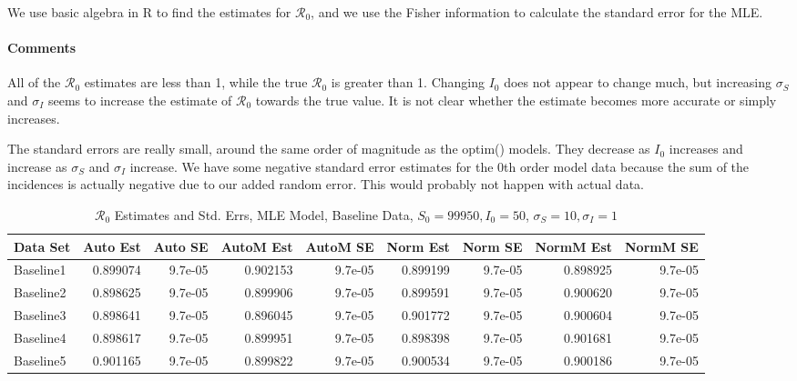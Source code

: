 \documentclass[12pt]{article}
\newcommand{\rr}{\ensuremath{\mathcal{R}_0}}
\begin{document}
We use basic algebra in R to find the estimates for $\rr$, and we use the Fisher information to calculate the standard error for the MLE.

\paragraph{Comments}

All of the $\rr$ estimates are less than 1, while the true $\rr$ is greater than 1. Changing $I_0$ does not appear to change much, but increasing $\sigma_S$ and $\sigma_I$ seems to increase the estimate of $\rr$ towards the true value. It is not clear whether the estimate becomes more accurate or simply increases.

The standard errors are really small, around the same order of magnitude as the optim() models. They decrease as $I_0$ increases and increase as $\sigma_S$ and $\sigma_I$ increase. We have some negative standard error estimates for the 0th order model data because the sum of the incidences is actually negative due to our added random error. This would probably not happen with actual data.

\begin{table}[H]
	
	\caption{$\rr$ Estimates and Std. Errs, MLE Model, 
		Baseline Data, $S_0 = 99950, I_0 = 50$, 
		$\sigma_S = 10, \sigma_I = 1$}
	\begin{footnotesize}
		\hskip -1cm
	\begin{tabular}{l|r|r|r|r|r|r|r|r}
		\hline
		Data Set & Auto Est & Auto SE & AutoM Est & AutoM SE & Norm Est & Norm SE & NormM Est & NormM SE\\
		\hline
		Baseline1 & 0.899074 & 9.7e-05 & 0.902153 & 9.7e-05 & 0.899199 & 9.7e-05 & 0.898925 & 9.7e-05\\
		\hline
		Baseline2 & 0.898625 & 9.7e-05 & 0.899906 & 9.7e-05 & 0.899591 & 9.7e-05 & 0.900620 & 9.7e-05\\
		\hline
		Baseline3 & 0.898641 & 9.7e-05 & 0.896045 & 9.7e-05 & 0.901772 & 9.7e-05 & 0.900604 & 9.7e-05\\
		\hline
		Baseline4 & 0.898617 & 9.7e-05 & 0.899951 & 9.7e-05 & 0.898398 & 9.7e-05 & 0.901681 & 9.7e-05\\
		\hline
		Baseline5 & 0.901165 & 9.7e-05 & 0.899822 & 9.7e-05 & 0.900534 & 9.7e-05 & 0.900186 & 9.7e-05\\
		\hline
	\end{tabular}
\end{footnotesize}
\end{table}
\end{document}
